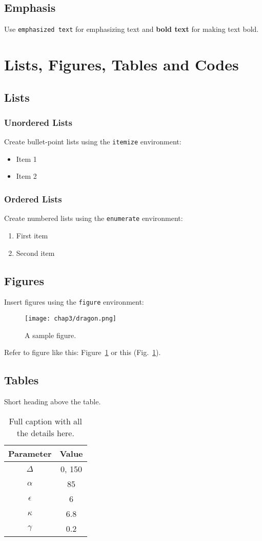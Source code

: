 \subsection{Emphasis}
Use \texttt{emphasized text} for emphasizing text and \textbf{bold text} for making text bold.

\section{Lists, Figures, Tables and Codes}
\subsection{Lists}
\subsubsection{Unordered Lists}
Create bullet-point lists using the \texttt{itemize} environment:
\begin{itemize}
  \item Item 1
  \item Item 2
\end{itemize}

\subsubsection{Ordered Lists}
Create numbered lists using the \texttt{enumerate} environment:
\begin{enumerate}
  \item First item
  \item Second item
\end{enumerate}

\subsection{Figures}
Insert figures using the \texttt{figure} environment:
\begin{figure}[H]
  \centering
  \texttt{[image: chap3/dragon.png]}
  \caption{A sample figure.}
  \label{fig:sample}
\end{figure}

Refer to figure like this: Figure~\ref{fig:sample} or this (Fig.~\ref{fig:sample}).


\subsection{Tables}
\begin{table}[H]
    \center
    \caption{Short heading above the table.}
    \begin{tabular}{c|c}
    Parameter & Value \\ \hline \hline
    $\Delta$ & 0, 150 \\
    ${\alpha}$ & 85 \\
    ${\epsilon}$ & 6 \\
    ${\kappa}$ & 6.8 \\
    ${\gamma}$ & 0.2
    \end{tabular}
    \label{tab:values}
    \caption*{Full caption with all the details here.}
    \end{table}

